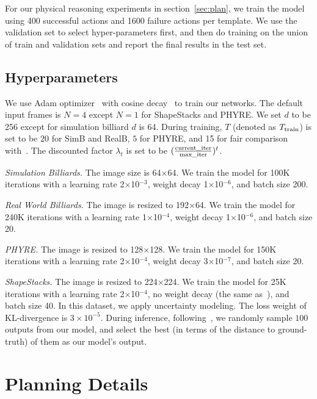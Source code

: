 \documentclass{article} \usepackage{iclr2021_conference,times}
\newcommand{\numinput}{N}
\newcommand{\numoutput}{T}
\newcommand{\featdim}{d}
\begin{document}
For our physical reasoning experiments in section~\ref{sec:plan}, we train the model using 400 successful actions and 1600 failure actions per template. We use the validation set to select hyper-parameters first, and then do training on the union of train and validation sets and report the final results in the test set.

\subsection{Hyperparameters}
We use Adam optimizer~\cite{kingma2014adam} with cosine decay~\cite{loshchilov2016sgdr} to train our networks. The default input frames is $\numinput=4$ except $\numinput=1$ for ShapeStacks and PHYRE. We set $\featdim$ to be 256 except for simulation billiard $d$ is 64. During training, $\numoutput$ (denoted as $\numoutput_{\rm train}$) is set to be $20$ for SimB and RealB, $5$ for PHYRE, and 15 for fair comparison with~\cite{ye2019cvp}. The discounted factor $\lambda_t$ is set to be $({\frac{\rm current\_iter}{\rm max\_iter}})^t$.

\textit{Simulation Billiards.} The image size is 64$\times$64. We train the model for 100K iterations with a learning rate 2$\times$10$^{-3}$, weight decay 1$\times$10$^{-6}$, and batch size 200.

\textit{Real World Billiards.} The image is resized to 192$\times$64. We train the model for 240K iterations with a learning rate 1$\times$10$^{-4}$, weight decay 1$\times$10$^{-6}$, and batch size 20.

\textit{PHYRE.} The image is resized to 128$\times$128. We train the model for 150K iterations with a learning rate 2$\times$10$^{-4}$, weight decay 3$\times$10$^{-7}$, and batch size 20.

\textit{ShapeStacks.} The image is resized to 224$\times$224. We train the model for 25K iterations with a learning rate 2$\times$10$^{-4}$, no weight decay (the same as~\cite{ye2019cvp}), and batch size 40. In this dataset, we apply uncertainty modeling. The loss weight of KL-divergence is $3\times 10^{-5}$. During inference, following~\cite{ye2019cvp}, we randomly sample $100$ outputs from our model, and select the best (in terms of the distance to ground-truth) of them as our model's output.

\section{Planning Details}
\end{document}

